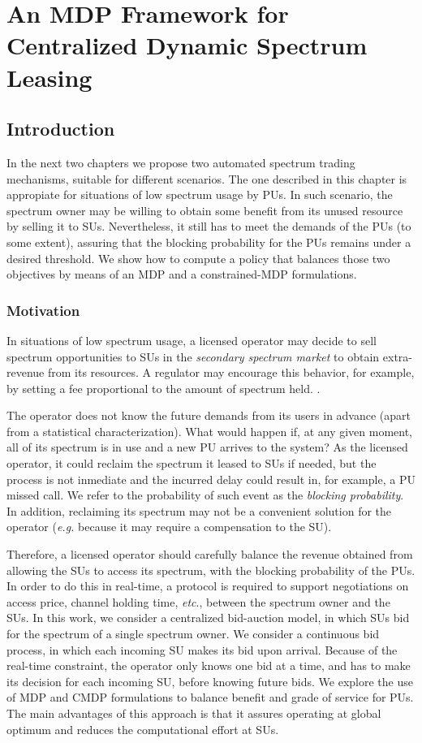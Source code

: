 \graphicspath{ {img/Sarnoff/} }
\chapter{An MDP Framework for Centralized Dynamic Spectrum Leasing}\label{Sarnoff_chap}
\section{Introduction}
In the next two chapters we propose two automated spectrum trading mechanisms, suitable for different scenarios. The one described in this chapter is appropiate for situations of low spectrum usage by PUs. In such scenario, the spectrum owner may be willing to obtain some benefit from its unused resource by selling it to SUs. Nevertheless, it still has to meet the demands of the PUs (to some extent), assuring that the blocking probability for the PUs remains under a desired threshold. We show how to compute a policy that balances those two objectives by means of an MDP and a constrained-MDP formulations. 

\subsection{Motivation}
In situations of low spectrum usage, a licensed operator may decide to sell spectrum opportunities to SUs in the \textit{secondary spectrum market} to obtain extra-revenue from its resources. A regulator may encourage this behavior, for example, by setting a fee proportional to the amount of spectrum held. \cite{AdvisorsonScience}.  

The operator does not know the future demands from its users in advance (apart from a statistical characterization). What would happen if, at any given moment, all of its spectrum is in use and a new PU arrives to the system? As the licensed operator, it could reclaim the spectrum it leased to SUs if needed, but the process is not inmediate and the incurred delay could result in, for example, a PU missed call. We refer to the probability of such event as the \emph{blocking probability}. In addition, reclaiming its spectrum may not be a convenient solution for the operator (\textit{e.g.} because it may require a compensation to the SU). 

Therefore, a licensed operator should carefully balance the revenue obtained from allowing the SUs to access its spectrum, with the blocking probability of the PUs. In order to do this in real-time, a protocol is required to support negotiations on access price, channel holding time, \textit{etc}., between the spectrum owner and the SUs. In this work, we consider a centralized bid-auction model, in which SUs bid for the spectrum of a single spectrum owner. We consider a continuous bid process, in which each incoming SU makes its bid upon arrival. Because of the real-time constraint, the operator only knows one bid at a time, and has to make its decision for each incoming SU, before knowing future bids.
We explore the use of MDP and CMDP formulations to balance benefit and grade of service for PUs. The main advantages of this approach is that it assures operating at global optimum and reduces the computational effort at SUs.

